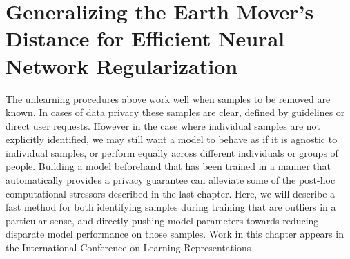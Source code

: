 \chapter{Generalizing the Earth Mover's Distance for Efficient Neural Network Regularization}\label{chap:demd}

The unlearning procedures above work well
when samples to be removed are known.
In cases of data privacy these samples are clear,
defined by guidelines or direct user requests.
However in the case where individual
samples are not explicitly identified,
we may still want a model to behave as if
it is agnostic to individual samples,
or perform equally across different individuals
or groups of people. Building a model
beforehand that has been trained in a manner
that automatically provides a privacy guarantee
can alleviate some of the post-hoc
computational stressors described in the last chapter.
Here, we will describe a fast method
for both identifying samples during training
that are outliers in a particular sense,
and directly pushing model parameters
towards reducing disparate model performance
on those samples.
Work in this chapter appears in the International
Conference on Learning Representations~\citep{demd}.






